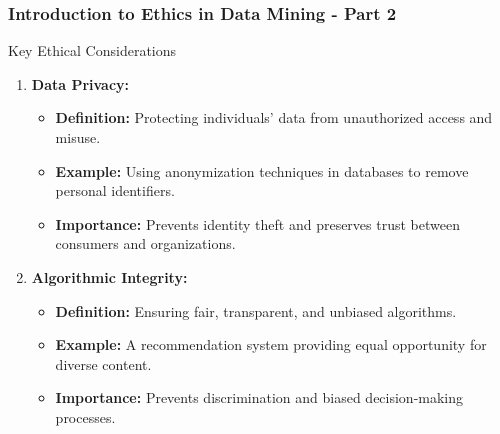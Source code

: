 \documentclass[aspectratio=169]{beamer}
\begin{document}
\begin{frame}[fragile]
    \frametitle{Introduction to Ethics in Data Mining - Part 2}
    
    \begin{block}{Key Ethical Considerations}
        \begin{enumerate}
            \item \textbf{Data Privacy:}
            \begin{itemize}
                \item \textbf{Definition:} Protecting individuals' data from unauthorized access and misuse.
                \item \textbf{Example:} Using anonymization techniques in databases to remove personal identifiers.
                \item \textbf{Importance:} Prevents identity theft and preserves trust between consumers and organizations.
            \end{itemize}

            \item \textbf{Algorithmic Integrity:}
            \begin{itemize}
                \item \textbf{Definition:} Ensuring fair, transparent, and unbiased algorithms.
                \item \textbf{Example:} A recommendation system providing equal opportunity for diverse content.
                \item \textbf{Importance:} Prevents discrimination and biased decision-making processes.
            \end{itemize}
        \end{enumerate}
    \end{block}
\end{frame}
\end{document}
